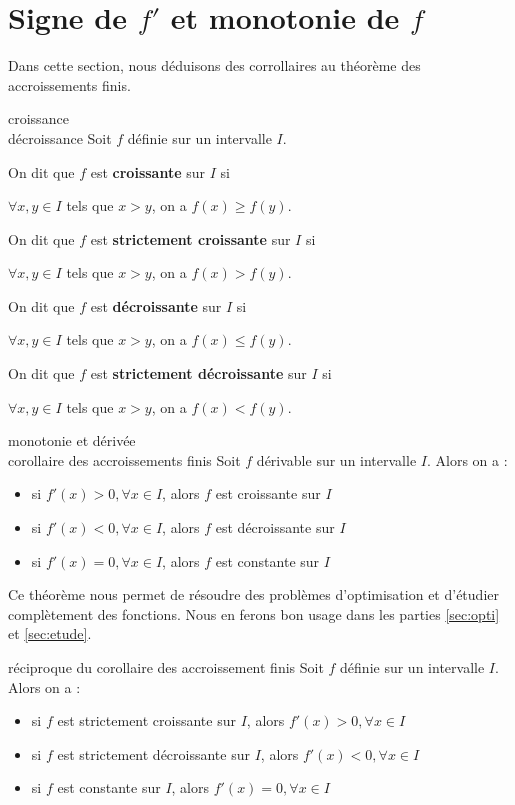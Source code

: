 \documentclass[a4paper,12pt]{article}
\begin{document}
\section{Signe de $f'$ et monotonie de $f$}
\begin{autre}
	\tcblower
	Dans cette section, nous déduisons des corrollaires au théorème des accroissements finis.
\end{autre}
\begin{definition}
	croissance\\
	décroissance
	\tcblower
Soit $f$ définie sur un intervalle $I$.

On dit que $f$ est \textbf{croissante} sur $I$ si 

$\forall x,y\in I$ tels que $x>y$, on a $f(x) \geq f(y)$.

On dit que $f$ est \textbf{strictement croissante} sur $I$ si

$\forall x,y\in I$ tels que $x>y$, on a $f(x) > f(y)$.

On dit que $f$ est \textbf{décroissante} sur $I$ si

$\forall x,y\in I$ tels que $x>y$, on a $f(x) \leq f(y)$.

On dit que $f$ est \textbf{strictement décroissante} sur $I$ si

$\forall x,y\in I$ tels que $x>y$, on a $f(x) < f(y)$.
\end{definition}
\begin{thm}
	monotonie et dérivée\\
	corollaire des accroissements finis
	\tcblower
Soit $f$ dérivable sur un intervalle $I$. Alors on a :
\begin{itemize}
	\item si $f'(x) > 0, \forall x \in I$, alors $f$ est croissante sur $I$
\item si $f'(x) < 0, \forall x \in I$, alors $f$ est décroissante sur $I$
\item si $f'(x) = 0, \forall x \in I$, alors $f$ est constante sur $I$
\end{itemize}
\end{thm}
\begin{remarque}
	\tcblower
	Ce théorème nous permet de résoudre des problèmes d'optimisation et d'étudier complètement des fonctions. Nous en ferons bon usage dans les parties \ref{sec:opti} et \ref{sec:etude}.
\end{remarque}
\begin{thm}
réciproque du corollaire des accroissement finis
\tcblower
Soit $f$ définie sur un intervalle $I$.
Alors on a :
\begin{itemize}
\item si $f$ est strictement croissante sur $I$, alors $f'(x) > 0, \forall x \in I$
\item si $f$ est strictement décroissante sur $I$, alors $f'(x) < 0, \forall x \in I$
\item si $f$ est constante sur $I$, alors $f'(x) = 0, \forall x \in I$
\end{itemize}
\end{thm}
\end{document}
